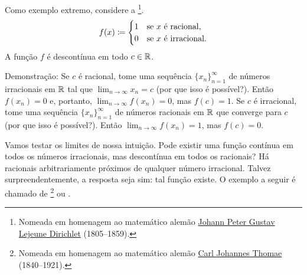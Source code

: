 \begin{example}
Como exemplo extremo, considere a
\emph{}\footnote{Nomeada em homenagem ao matemático alemão
\href{https://en.wikipedia.org/wiki/Peter_Gustav_Lejeune_Dirichlet}{Johann Peter Gustav Lejeune
Dirichlet}
(1805--1859).}.
\begin{equation*}
f(x) \coloneqq
\begin{cases}
1 & \text{se } x \text{ é racional,} \\
0 & \text{se } x \text{ é irracional.}
\end{cases}
\avoidbreak
\end{equation*}
A função $f$ é descontínua em todo $c \in {\mathbb{R}}$.

Demonstração:
Se $c$ é racional, tome uma sequência $\{ x_n \}_{n=1}^\infty$
de números irracionais em ${\mathbb{R}}$ tal que $\lim_{n\to\infty} x_n = c$ (por que isso é possível?). Então $f(x_n) = 0$
e, portanto, $\lim_{n\to\infty} f(x_n) = 0$, mas $f(c) = 1$.
Se $c$ é irracional, tome uma sequência
$\{ x_n \}_{n=1}^\infty$
de números racionais em ${\mathbb{R}}$
que converge para $c$ (por que isso é possível?). Então $\lim_{n\to\infty} f(x_n) = 1$, mas $f(c) = 0$.
\end{example}

Vamos testar os limites de nossa intuição. Pode
existir uma função contínua em todos os números irracionais, mas
descontínua em todos os racionais? Há racionais
arbitrariamente próximos de qualquer número irracional. Talvez surpreendentemente, a
resposta seja sim: tal função existe. O exemplo a seguir é chamado de
\emph{}\footnote{Nomeada em homenagem ao matemático alemão
\href{https://en.wikipedia.org/wiki/Carl_Johannes_Thomae}{Carl Johannes Thomae}
(1840--1921).} ou
\emph{}.

